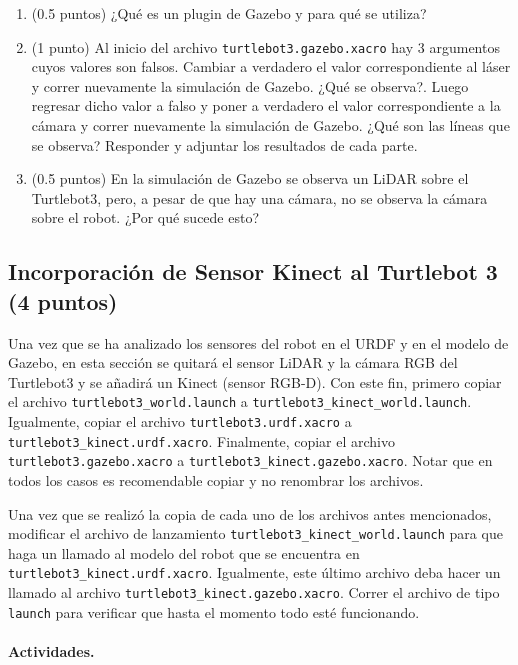 \documentclass[a4paper,11pt]{robotlabs}
\begin{document}
\begin{enumerate}
\item (0.5 puntos) ¿Qué es un plugin de Gazebo y para qué se utiliza?

\item (1 punto) Al inicio del archivo \texttt{turtlebot3.gazebo.xacro} hay 3
  argumentos cuyos valores son falsos. Cambiar a verdadero el valor
  correspondiente al láser y correr nuevamente la simulación de Gazebo. ¿Qué se
  observa?. Luego regresar dicho valor a falso y poner a verdadero el valor
  correspondiente a la cámara y correr nuevamente la simulación de Gazebo. ¿Qué
  son las líneas que se observa? Responder y adjuntar los resultados de cada
  parte.

\item (0.5 puntos) En la simulación de Gazebo se observa un LiDAR sobre el Turtlebot3, pero,
  a pesar de que hay una cámara, no se observa la cámara sobre el robot. ¿Por
  qué sucede esto?
  
\end{enumerate}


\subsection{Incorporación de Sensor Kinect al Turtlebot 3 (4 puntos)}

Una vez que se ha analizado los sensores del robot en el URDF y en el modelo de
Gazebo, en esta sección se quitará el sensor LiDAR y la cámara RGB del
Turtlebot3 y se añadirá un Kinect (sensor RGB-D). Con este fin, primero copiar
el archivo \texttt{turtlebot3\_world.launch} a
\texttt{turtlebot3\_kinect\_world.launch}. Igualmente, copiar el archivo
\texttt{turtlebot3.urdf.xacro} a
\texttt{turtlebot3\_kinect.urdf.xacro}. Finalmente, copiar el archivo
\texttt{turtlebot3.gazebo.xacro} a
\texttt{turtlebot3\_kinect.gazebo.xacro}. Notar que en todos los casos es
recomendable copiar y no renombrar los archivos.

Una vez que se realizó la copia de cada uno de los archivos antes mencionados,
modificar el archivo de lanzamiento \texttt{turtlebot3\_kinect\_world.launch}
para que haga un llamado al modelo del robot que se encuentra en
\texttt{turtlebot3\_kinect.urdf.xacro}. Igualmente, este último archivo deba
hacer un llamado al archivo \texttt{turtlebot3\_kinect.gazebo.xacro}. Correr el
archivo de tipo \texttt{launch} para verificar que hasta el momento todo esté
funcionando. 

\paragraph{Actividades.}
\end{document}
